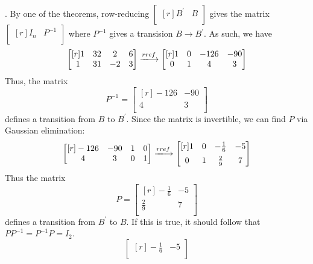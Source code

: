 \documentclass{article}
\theoremstyle{definition}
\newenvironment{solution}[1][]{\begin{replacementsoln}}{\end{replacementsoln}}
\begin{document}
\begin{solution}.
  By one of the theorems, row-reducing \(\begin{bmatrix}[r]
    B^{\prime}  &B   \\
  \end{bmatrix}\) gives the matrix \(\begin{bmatrix}[r]
    I_n &P ^{-1}    \\
  \end{bmatrix}\) where \(P ^{-1} \) gives a transision \(B \to B^{\prime} \). As such, we have
  \[
    \begin{bmatrix}[r]
      1 &  32&2  & 6  \\
      1 &31  & -2 & 3  \\
    \end{bmatrix}\xlongrightarrow{rref} \begin{bmatrix}[r]
      1 &0  &-126  &-90   \\
       0&1  &4  &3   \\
    \end{bmatrix}
  \]
  Thus, the matrix
  \[
    P ^{-1} =\begin{bmatrix}[r]
      -126 &-90   \\
       4&3   \\
    \end{bmatrix}
  \]
  defines a transition from \(B\) to \(B^{\prime} \). Since the matrix is invertible, we can find \(P\) via Gaussian elimination:
  \[
    \begin{bmatrix}[r]
      -126 &-90  &1  &0   \\
       4&3  &0  &1   \\
    \end{bmatrix}\xlongrightarrow{rref} \begin{bmatrix}[r]
      1 &0  &-\frac{1}{6}  &-5   \\[5pt]
       0&1  &  \frac{2}{9}&7   \\
    \end{bmatrix}
  \]
  Thus the matrix 
  \[
    P = \begin{bmatrix}[r]
      -\frac{1}{6} &-5   \\[5pt]
       \frac{2}{9}&  7 \\
    \end{bmatrix}
  \]
  defines a transition from \(B^{\prime} \) to \(B\). If this is true, it should follow that \(P P ^{-1} =P ^{-1} P=I_{2} \).
  \[
    \begin{bmatrix}[r]
      -\frac{1}{6} &-5   \\[5pt]

\end{bmatrix}\]
\end{solution}
\end{document}
